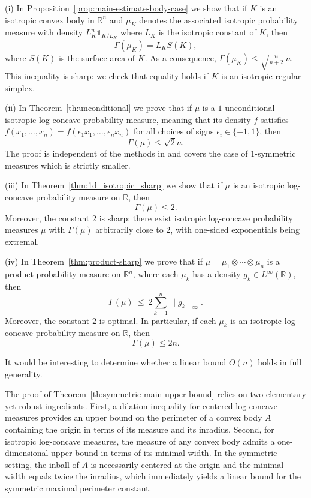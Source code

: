 \documentclass[11pt,leqno]{article}
\theoremstyle{remark}
\numberwithin{equation}{section}
\newcommand{\ls}{\leqslant}
\begin{document}
\smallskip 

(i) In Proposition~\ref{prop:main-estimate-body-case} we show that if $K$ is an isotropic convex body in $\mathbb{R}^n$ and $\mu_K$ denotes 
the associated isotropic probability measure with density $L_K^n\mathds{1}_{K/L_K}$ where $L_K$ is the isotropic constant of $K$, then
$$\Gamma(\mu_K)=L_KS(K),$$
where $S(K)$ is the surface area of $K$. As a consequence, $\Gamma(\mu_K)\ls \sqrt{\frac{n}{n+2}}\,n$. This inequality is sharp: we check 
that equality holds if $K$ is an isotropic regular simplex.

\smallskip 

(ii) In Theorem~\ref{th:unconditional} we prove that if $\mu$ is a $1$-unconditional isotropic log-concave probability measure,
meaning that its density $f$ satisfies $f(x_1,\ldots,x_n)=f(\epsilon_1 x_1,\ldots,\epsilon_n x_n)$ for all choices of signs $\epsilon_i\in\{-1,1\}$, then
$$\Gamma(\mu)\ls\sqrt{2}n.$$
The proof is independent of the methods in \cite{Livshyts-2021} and covers the case of $1$-symmetric measures which is strictly smaller.

\smallskip 

(iii) In Theorem~\ref{thm:1d_isotropic_sharp} we show that if $\mu$ is an isotropic log-concave probability measure on $\mathbb{R}$, then
$$\Gamma(\mu)\ls 2.$$
Moreover, the constant $2$ is sharp: there exist isotropic log-concave probability measures $\mu$ with
$\Gamma(\mu)$ arbitrarily close to $2$, with one-sided exponentials being extremal.

\smallskip 

(iv) In Theorem~\ref{thm:product-sharp} we prove that if $\mu=\mu_1\otimes\cdots\otimes\mu_n$ is a product probability measure on $\mathbb{R}^n$,
where each $\mu_k$ has a density $g_k\in L^\infty(\mathbb{R})$, then
$$\Gamma(\mu)\ \ls\ 2\sum_{k=1}^n \|g_k\|_\infty.$$
Moreover, the constant $2$ is optimal. In particular, if each $\mu_k$ is an isotropic log-concave probability measure on $\mathbb{R}$, then 
$$\Gamma(\mu)\ls 2n.$$

\medskip 

It would be interesting to determine whether a linear bound $O(n)$ holds in full generality.

\medskip 

The proof of Theorem~\ref{th:symmetric-main-upper-bound} relies on two elementary yet robust ingredients. 
First, a dilation inequality for centered log-concave measures provides an upper bound on the perimeter of a convex body $A$ 
containing the origin in terms of its measure and its inradius. 
Second, for isotropic log-concave measures, the measure of any convex body admits a one-dimensional upper bound in terms of its minimal width. 
In the symmetric setting, the inball of $A$ is necessarily centered at the origin and the minimal width equals twice the inradius, which
immediately yields a linear bound for the symmetric maximal perimeter constant.
\end{document}
